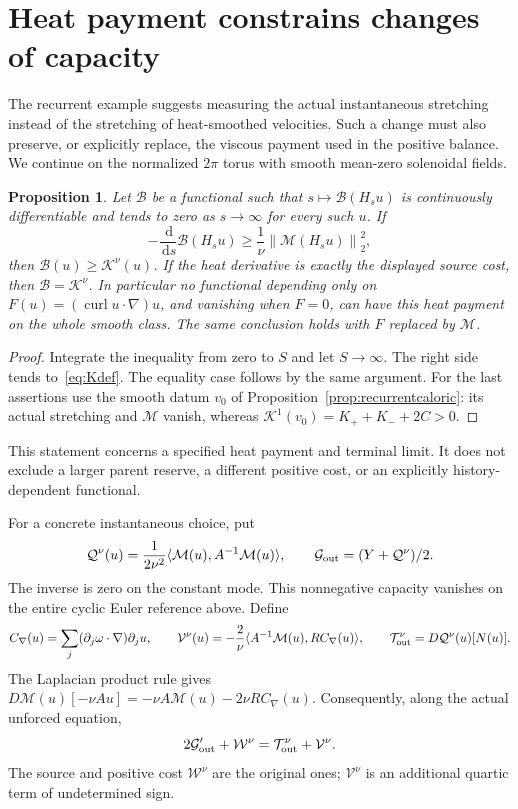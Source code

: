 \documentclass[11pt]{article}
\newtheorem{proposition}{Proposition}
\newcommand{\dd}{\,\mathrm d}
\newcommand{\norm}[1]{\left\lVert#1\right\rVert}
\newcommand{\curl}{\operatorname{curl}}
\begin{document}
\section{Heat payment constrains changes of capacity}

The recurrent example suggests measuring the actual instantaneous
stretching instead of the stretching of heat-smoothed velocities.
Such a change must also preserve, or explicitly replace, the viscous
payment used in the positive balance. We continue on the normalized
$2\pi$ torus with smooth mean-zero solenoidal fields.

\begin{proposition}\label{prop:heatminimality}
Let $\mathcal B$ be a functional such that
$s\mapsto\mathcal B(H_su)$ is continuously differentiable and tends to
zero as $s\to\infty$ for every such $u$. If
\[
 -\frac{\dd}{\dd s}\mathcal B(H_su)
       \geq\frac1\nu\norm{\mathcal M(H_su)}_2^2,
\]
then $\mathcal B(u)\geq\mathcal K^\nu(u)$. If the heat derivative
is exactly the displayed source cost, then
$\mathcal B=\mathcal K^\nu$.
In particular no functional depending only on
$F(u)=(\curl u\cdot\nabla)u$, and vanishing when $F=0$, can have
this heat payment on the whole smooth class. The same conclusion holds
with $F$ replaced by $\mathcal M$.
\end{proposition}
\begin{proof}
Integrate the inequality from zero to $S$ and let $S\to\infty$.
The right side tends to~\eqref{eq:Kdef}. The equality case follows
by the same argument. For the last assertions use the smooth datum
$v_0$ of Proposition~\ref{prop:recurrentcaloric}: its actual stretching
and $\mathcal M$ vanish, whereas
$\mathcal K^1(v_0)=K_++K_-+2C>0$.
\end{proof}

This statement concerns a specified heat payment and terminal limit.
It does not exclude a larger parent reserve, a different positive cost,
or an explicitly history-dependent functional.

For a concrete instantaneous choice, put
\[
 \mathcal Q^\nu(u)=\frac{1}{2\nu^2}
          \langle\mathcal M(u),A^{-1}\mathcal M(u)\rangle,
 \qquad \mathcal G_{\rm out}=(Y+\mathcal Q^\nu)/2.
\]
The inverse is zero on the constant mode. This nonnegative capacity
vanishes on the entire cyclic Euler reference above. Define
\[
 C_\nabla(u)=\sum_j(\partial_j\omega\cdot\nabla)\partial_j u,
 \qquad
 \mathcal V^\nu(u)=-\frac2\nu
       \langle A^{-1}\mathcal M(u),R C_\nabla(u)\rangle,
 \qquad
 \mathcal T_{\rm out}^\nu=D\mathcal Q^\nu(u)[N(u)].
\]
The Laplacian product rule gives
$D\mathcal M(u)[-\nu Au]=-\nu A\mathcal M(u)-2\nu R C_\nabla(u)$.
Consequently, along the actual unforced equation,
\begin{equation}\label{eq:outputcapacitybalance}
 2\mathcal G_{\rm out}'+\mathcal W^\nu
       =\mathcal T_{\rm out}^\nu+\mathcal V^\nu.
\end{equation}
The source and positive cost $\mathcal W^\nu$ are the original ones;
$\mathcal V^\nu$ is an additional quartic term of undetermined sign.
\end{document}
